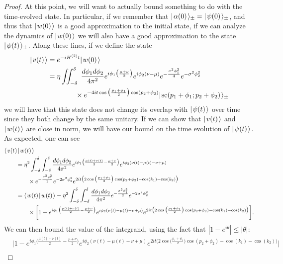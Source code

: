 \documentclass[../thesis-main/thesis-main]{subfiles}
\begin{document}
\begin{proof}
At this point, we will want to actually bound something to do with the time-evolved state.  In particular, if we remember that $|\mspace{2mu} \alpha(0) \mspace{2mu} \rangle_{\pm} = |\mspace{2mu} \psi(0) \mspace{2mu} \rangle_{\pm}$, and thus that $|\mspace{2mu} w(0) \mspace{2mu} \rangle$ is a good approximation to the initial state, if we can analyze the dynamics of $|\mspace{2mu} w(0) \mspace{2mu} \rangle$ we will also have a good approximation to the state $|\mspace{2mu} \psi(t) \mspace{2mu} \rangle_{\pm}$.  Along these lines, if we define the state
\begin{align}
  |\mspace{2mu} v(t) \mspace{2mu} \rangle &= e^{-i H^{(2)}t} |\mspace{2mu} w(0) \mspace{2mu} \rangle \\
  &= \eta \iint_{-\delta}^\delta \ \frac{d\phi_1 d\phi_2}{4\pi^2} e^{i \phi_1 \big(\frac{\mu + \nu}{2}\big)} e^{i  \phi_2 (\nu - \mu)} e^{ -\frac{ \sigma^2 \phi_1^2}{4}} e^{ -\sigma^2 \phi_2^2}\nonumber\\
  &\qquad\qquad \times e^{- 4 i t \cos\big(\frac{p_1+\phi_1}{2}\big)\cos(p_2+\phi_2)} |\mspace{2mu} \text{sc}(p_1 + \phi_1; p_2 + \phi_2) \mspace{2mu} \rangle_{\pm}
\end{align}
we will have that this state does not change its overlap with $|\mspace{2mu} \psi(t) \mspace{2mu} \rangle$ over time since they both change by the same unitary.  If we can show that $|\mspace{2mu} v(t) \mspace{2mu} \rangle$ and $|\mspace{2mu} w(t) \mspace{2mu} \rangle$ are close in norm, we will have our bound on the time evolution of $|\mspace{2mu} \psi(t) \mspace{2mu} \rangle$.  As expected, one can see
\begin{align}
   &\langle\mspace{2mu} v(t) \mspace{2mu} | \mspace{2mu} w(t)\mspace{2mu} \rangle \nonumber\\
   &\qquad= \eta^2 \int_{-\delta}^\delta \int_{-\delta}^\delta \frac{d\phi_1 d\phi_2}{4\pi^2} e^{i \phi_1 \big(\frac{\mu(t) + \nu(t)}{2} - \frac{\mu +\nu}{2} \big)} e^{i  \phi_2 (\nu(t) - \mu(t) -\nu + \mu)} \nonumber\\
   & \qquad\qquad \times e^{ -\frac{ \sigma^2 \phi_1^2}{2}} e^{ -2\sigma^2 \phi_2^2} e^{ 2 i t\big( 2 \cos\big(\frac{p_1+\phi_1}{2}\big)\cos(p_2+\phi_2) - \cos(k_1) - \cos(k_2)\big)} \\
   & \qquad= \langle\mspace{2mu} w(t) \mspace{2mu} | \mspace{2mu} w(t)\mspace{2mu} \rangle - \eta^2 \int_{-\delta}^\delta \int_{-\delta}^\delta \frac{d\phi_1 d\phi_2}{4\pi^2}  e^{ -\frac{ \sigma^2 \phi_1^2}{2}} e^{ -2\sigma^2 \phi_2^2}\nonumber\\
   & \qquad\qquad \times \bigg[ 1 - e^{i \phi_1 \big(\frac{\mu(t) + \nu(t)}{2} - \frac{\mu +\nu}{2} \big)} e^{i  \phi_2 (\nu(t) - \mu(t) -\nu + \mu)}e^{ 2 i t\big( 2 \cos\big(\frac{p_1+\phi_1}{2}\big)\cos(p_2+\phi_2) - \cos(k_1) - \cos(k_2)\big)}\bigg] .
\end{align}
We can then bound the value of the integrand, using the fact that $|1 - e^{i\theta}| \leq |\theta|$:
\begin{align}
  &\bigg| 1 - e^{i \phi_1 \big(\frac{\mu(t) + \nu(t)}{2} - \frac{\mu +\nu}{2} \big)} e^{i  \phi_2 (\nu(t) - \mu(t) -\nu + \mu)}e^{ 2 i t\big( 2 \cos\big(\frac{p_1+\phi_1}{2}\big)\cos(p_2+\phi_2) - \cos(k_1) - \cos(k_2)\big)}\bigg|\nonumber\\

\end{align}
\end{proof}
\end{document}
